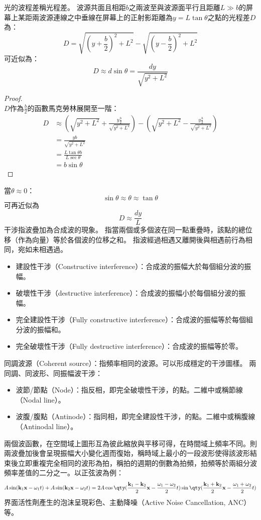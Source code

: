 \documentclass[a4paper,12pt]{report}
\begin{document}
光的波程差稱光程差。
波源共面且相距$b$之兩波至與波源面平行且距離$L\gg b$的屏幕上某距兩波源連線之中垂線在屏幕上的正射影距離為$y=L\tan\theta$之點的光程差$D$為：
\[D = \sqrt{\left(y + \frac{b}{2}\right)^2 + L^2} - \sqrt{\left(y - \frac{b}{2}\right)^2 + L^2}\]
可近似為：
\[D\approx d\sin\theta=\frac{dy}{\sqrt{y^2+L^2}}\]
\begin{proof}\mbox{}\\
$D$作為$\frac{b}{2}$的函數馬克勞林展開至一階：
\[\begin{aligned}
D &\approx \left(\sqrt{y^2 + L^2} + \frac{y\frac{b}{2}}{\sqrt{y^2 + L^2}}\right) - \left(\sqrt{y^2 + L^2} - \frac{y\frac{b}{2}}{\sqrt{y^2 + L^2}}\right)\\
&= \frac{yb}{\sqrt{y^2 + L^2}}\\
&= \frac{L\tan\theta b}{L\sec\theta}\\
&= b\sin\theta
\end{aligned}\]
\end{proof}
當$\theta\approx 0$：
\[\sin\theta\approx\theta\approx\tan\theta\]
可再近似為
\[D\approx\frac{dy}{L}\]
干涉指波疊加為合成波的現象。
指當兩個或多個波在同一點重疊時，該點的總位移（作為向量）等於各個波的位移之和。
指波經過相遇又離開後與相遇前行為相同，宛如未相遇過。
\begin{itemize}
\item 建設性干涉（Constructive interference）：合成波的振幅大於每個組分波的振幅。
\item 破壞性干涉（destructive interference）：合成波的振幅小於每個組分波的振幅。
\item 完全建設性干涉（Fully constructive interference）：合成波的振幅等於每個組分波的振幅和。
\item 完全破壞性干涉（Fully destructive interference）：合成波的振幅等於零。
\end{itemize}
同調波源（Coherent source）：指頻率相同的波源。可以形成穩定的干涉圖樣。
兩同調、同波形、同振幅波干涉：
\begin{itemize}
\item 波節/節點（Node）：指反相，即完全破壞性干涉，的點。二維中或稱節線（Nodal line）。
\item 波腹/腹點（Antinode）：指同相，即完全建設性干涉，的點。二維中或稱腹線（Antinodal line）。
\end{itemize}
兩個波函數，在空間域上圖形互為彼此縮放與平移可得，在時間域上頻率不同。則兩波疊加後會呈現振幅大小變化週而復始，稱時域上最小的一段波形使得該波形結束後立即重複完全相同的波形為拍，稱拍的週期的倒數為拍頻，拍頻等於兩組分波頻率差值的二分之一。以正弦波為例：
\[A\sin(\mathbf{k}_1\mathbf{x}-\omega_1 t)+A\sin(\mathbf{k}_2\mathbf{x}-\omega_2 t)=2A\cos\qty(\frac{\mathbf{k}_1-\mathbf{k}_2}{2}\mathbf{x}-\frac{\omega_1-\omega_2}{2}t)\sin\qty(\frac{\mathbf{k}_1+\mathbf{k}_2}{2}\mathbf{x}-\frac{\omega_1+\omega_2}{2}t)\]
界面活性劑產生的泡沫呈現彩色、主動降噪（Active Noise Cancellation, ANC）等。
\end{document}
